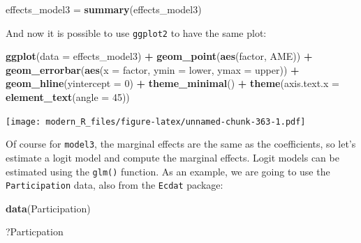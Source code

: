 \documentclass[]{gitbook}
\newenvironment{Shaded}{\begin{snugshade}}{\end{snugshade}}
\newcommand{\DataTypeTok}[1]{\textcolor[rgb]{0.13,0.29,0.53}{#1}}
\newcommand{\DecValTok}[1]{\textcolor[rgb]{0.00,0.00,0.81}{#1}}
\newcommand{\KeywordTok}[1]{\textcolor[rgb]{0.13,0.29,0.53}{\textbf{#1}}}
\newcommand{\NormalTok}[1]{#1}
\newcommand{\OperatorTok}[1]{\textcolor[rgb]{0.81,0.36,0.00}{\textbf{#1}}}
\newcommand{\StringTok}[1]{\textcolor[rgb]{0.31,0.60,0.02}{#1}}
\theoremstyle{definition}
\theoremstyle{definition}
\theoremstyle{definition}
\theoremstyle{remark}
\begin{document}
\begin{Shaded}
\begin{Highlighting}[]
\NormalTok{effects_model3 =}\StringTok{ }\KeywordTok{summary}\NormalTok{(effects_model3)}
\end{Highlighting}
\end{Shaded}

And now it is possible to use \texttt{ggplot2} to have the same plot:

\begin{Shaded}
\begin{Highlighting}[]
\KeywordTok{ggplot}\NormalTok{(}\DataTypeTok{data =}\NormalTok{ effects_model3) }\OperatorTok{+}
\StringTok{  }\KeywordTok{geom_point}\NormalTok{(}\KeywordTok{aes}\NormalTok{(factor, AME)) }\OperatorTok{+}
\StringTok{  }\KeywordTok{geom_errorbar}\NormalTok{(}\KeywordTok{aes}\NormalTok{(}\DataTypeTok{x =}\NormalTok{ factor, }\DataTypeTok{ymin =}\NormalTok{ lower, }\DataTypeTok{ymax =}\NormalTok{ upper)) }\OperatorTok{+}
\StringTok{  }\KeywordTok{geom_hline}\NormalTok{(}\DataTypeTok{yintercept =} \DecValTok{0}\NormalTok{) }\OperatorTok{+}
\StringTok{  }\KeywordTok{theme_minimal}\NormalTok{() }\OperatorTok{+}
\StringTok{  }\KeywordTok{theme}\NormalTok{(}\DataTypeTok{axis.text.x =} \KeywordTok{element_text}\NormalTok{(}\DataTypeTok{angle =} \DecValTok{45}\NormalTok{))}
\end{Highlighting}
\end{Shaded}

\texttt{[image: modern\_R\_files/figure-latex/unnamed-chunk-363-1.pdf]}

Of course for \texttt{model3}, the marginal effects are the same as the
coefficients, so let's estimate a logit model and compute the marginal
effects. Logit models can be estimated using the \texttt{glm()}
function. As an example, we are going to use the \texttt{Participation}
data, also from the \texttt{Ecdat} package:

\begin{Shaded}
\begin{Highlighting}[]
\KeywordTok{data}\NormalTok{(Participation)}
\end{Highlighting}
\end{Shaded}

\begin{Shaded}
\begin{Highlighting}[]
\NormalTok{?Particpation}
\end{Highlighting}
\end{Shaded}
\end{document}
